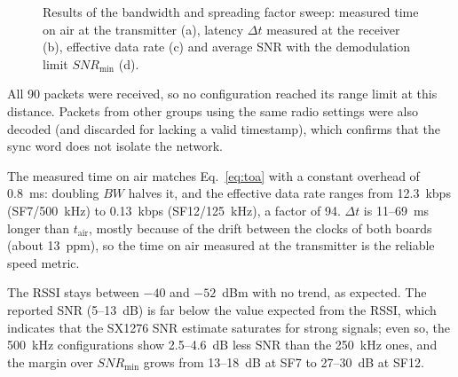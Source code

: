 \documentclass[informe,english]{plantilla}
\begin{document}
\begin{figure}[htbp]
    \medskip
    \hfill
    \caption{Results of the bandwidth and spreading factor sweep: measured time on air at the transmitter (a), latency $\Delta t$ measured at the receiver (b), effective data rate (c) and average SNR with the demodulation limit $SNR_{\min}$ (d).}
    \label{fig:bw-results}
\end{figure}

All 90 packets were received, so no configuration reached its range limit at this distance. Packets from other groups using the same radio settings were also decoded (and discarded for lacking a valid timestamp), which confirms that the sync word does not isolate the network.

The measured time on air matches Eq.~\eqref{eq:toa} with a constant overhead of 0.8~ms: doubling $BW$ halves it, and the effective data rate ranges from 12.3~kbps (SF7/500~kHz) to 0.13~kbps (SF12/125~kHz), a factor of 94. $\Delta t$ is 11--69~ms longer than $t_{\text{air}}$, mostly because of the drift between the clocks of both boards (about 13~ppm), so the time on air measured at the transmitter is the reliable speed metric.

The RSSI stays between $-40$ and $-52$~dBm with no trend, as expected. The reported SNR (5--13~dB) is far below the value expected from the RSSI, which indicates that the SX1276 SNR estimate saturates for strong signals; even so, the 500~kHz configurations show 2.5--4.6~dB less SNR than the 250~kHz ones, and the margin over $SNR_{\min}$ grows from 13--18~dB at SF7 to 27--30~dB at SF12.
\end{document}
